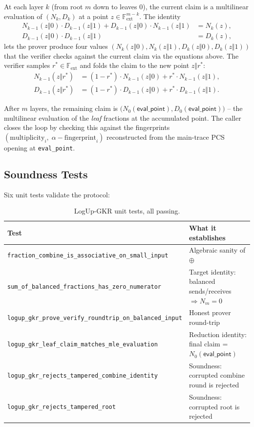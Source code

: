At each layer $k$ (from root $m$ down to leaves $0$), the current claim
is a multilinear evaluation of $(N_k, D_k)$ at a point $z \in \mathbb{F}_{\mathrm{ext}}^{m-k}$.
The identity
\begin{align*}
N_{k-1}(z \Vert 0) \cdot D_{k-1}(z \Vert 1) + D_{k-1}(z \Vert 0) \cdot N_{k-1}(z \Vert 1) &= N_k(z), \\
D_{k-1}(z \Vert 0) \cdot D_{k-1}(z \Vert 1) &= D_k(z),
\end{align*}
lets the prover produce four values $(N_k(z\Vert 0), N_k(z\Vert 1), D_k(z\Vert 0), D_k(z\Vert 1))$
that the verifier checks against the current claim via the equations
above.  The verifier samples $r^* \in \mathbb{F}_{\mathrm{ext}}$ and
folds the claim to the new point $z \Vert r^*$:
\begin{align*}
N_{k-1}(z \Vert r^*) &= (1 - r^*) \cdot N_{k-1}(z \Vert 0) + r^* \cdot N_{k-1}(z \Vert 1), \\
D_{k-1}(z \Vert r^*) &= (1 - r^*) \cdot D_{k-1}(z \Vert 0) + r^* \cdot D_{k-1}(z \Vert 1).
\end{align*}

After $m$ layers, the remaining claim is
$\bigl(N_0(\mathsf{eval\_point}), D_0(\mathsf{eval\_point})\bigr)$ -- the
multilinear evaluation of the \emph{leaf} fractions at the accumulated
point.  The caller closes the loop by checking this against the
fingerprints $(\text{multiplicity}_i,\; \alpha - \text{fingerprint}_i)$
reconstructed from the main-trace PCS opening at \texttt{eval\_point}.

\subsection{Soundness Tests}

Six unit tests validate the protocol:

\begin{table}[h]
\centering
\begin{tabular}{ll}
\toprule
\textbf{Test} & \textbf{What it establishes} \\
\midrule
\texttt{fraction\_combine\_is\_associative\_on\_small\_input} & Algebraic sanity of $\oplus$ \\
\texttt{sum\_of\_balanced\_fractions\_has\_zero\_numerator}   & Target identity: balanced sends/receives $\Rightarrow N_m = 0$ \\
\texttt{logup\_gkr\_prove\_verify\_roundtrip\_on\_balanced\_input} & Honest prover round-trip \\
\texttt{logup\_gkr\_leaf\_claim\_matches\_mle\_evaluation}    & Reduction identity: final claim = $N_0(\mathsf{eval\_point})$ \\
\texttt{logup\_gkr\_rejects\_tampered\_combine\_identity}     & Soundness: corrupted combine round is rejected \\
\texttt{logup\_gkr\_rejects\_tampered\_root}                  & Soundness: corrupted root is rejected \\
\bottomrule
\end{tabular}
\caption{LogUp-GKR unit tests, all passing.}
\label{tab:logup-gkr-tests}
\end{table}

